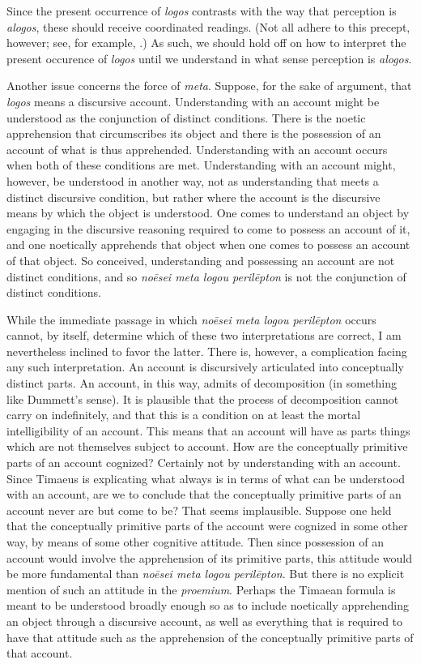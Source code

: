 Since the present occurrence of \emph{logos} contrasts with the way that perception is \emph{alogos}, these should receive coordinated readings. (Not all adhere to this precept, however; see, for example, \citealt[13]{Zeyl:2000cs}.) As such, we should hold off on how to interpret the present occurence of \emph{logos} until we understand in what sense perception is \emph{alogos}.

Another issue concerns the force of \emph{meta}. Suppose, for the sake of argument, that \emph{logos} means a discursive account. Understanding with an account might be understood as the conjunction of distinct conditions. There is the noetic apprehension that circumscribes its object and there is the possession of an account of what is thus apprehended. Understanding with an account occurs when both of these conditions are met. Understanding with an account might, however, be understood in another way, not as understanding that meets a distinct discursive condition, but rather where the account is the discursive means by which the object is understood. One comes to understand an object by engaging in the discursive reasoning required to come to possess an account of it, and one noetically apprehends that object when one comes to possess an account of that object. So conceived, understanding and possessing an account are not distinct conditions, and so \emph{noēsei meta logou perilēpton} is not the conjunction of distinct conditions. 

While the immediate passage in which \emph{noēsei meta logou perilēpton} occurs cannot, by itself, determine which of these two interpretations are correct, I am nevertheless inclined to favor the latter. There is, however, a complication facing any such interpretation. An account is discursively articulated into conceptually distinct parts. An account, in this way, admits of decomposition (in something like Dummett's \citeyear{dummett73} sense). It is plausible that the process of decomposition cannot carry on indefinitely, and that this is a condition on at least the mortal intelligibility of an account. This means that an account will have as parts things which are not themselves subject to account. How are the conceptually primitive parts of an account cognized? Certainly not by understanding with an account. Since Timaeus is explicating what always is in terms of what can be understood with an account, are we to conclude that the conceptually primitive parts of an account never are but come to be? That seems implausible. Suppose one held that the conceptually primitive parts of the account were cognized in some other way, by means of some other cognitive attitude. Then since possession of an account would involve the apprehension of its primitive parts, this attitude would be more fundamental than \emph{noēsei meta logou perilēpton}. But there is no explicit mention of such an attitude in the \emph{proemium}. Perhaps the Timaean formula is meant to be understood broadly enough so as to include noetically apprehending an object through a discursive account, as well as everything that is required to have that attitude such as the apprehension of the conceptually primitive parts of that account.

